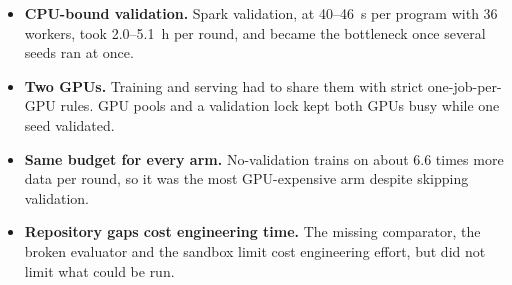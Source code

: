 \begin{itemize}
\item \textbf{CPU-bound validation.} Spark validation, at 40--46~s per program with 36 workers, took 2.0--5.1~h per
round, and became the bottleneck once several seeds ran at once.
\item \textbf{Two GPUs.} Training and serving had to share them with strict one-job-per-GPU rules. GPU pools and a
validation lock kept both GPUs busy while one seed validated.
\item \textbf{Same budget for every arm.} No-validation trains on about 6.6 times more data per round, so it was the
most GPU-expensive arm despite skipping validation.
\item \textbf{Repository gaps cost engineering time.} The missing comparator, the broken evaluator and the sandbox limit
cost engineering effort, but did not limit what could be run.
\end{itemize}
